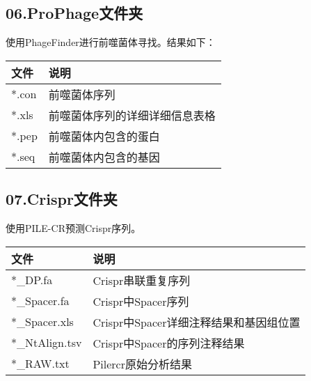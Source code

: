\subsection{06.ProPhage文件夹}
使用PhageFinder进行前噬菌体寻找。结果如下：
\begin{table}[H]
        \begin{center}
            \begin{threeparttable}
                \begin{tabularx}{\textwidth}{XX}

                    \toprule
                    \bfseries{文件}                  &\bfseries{说明}\\
                    \midrule
                    *.con                           &前噬菌体序列\\
                    *.xls                           &前噬菌体序列的详细详细信息表格\\
                    *.pep                           &前噬菌体内包含的蛋白\\
                    *.seq                           &前噬菌体内包含的基因\\
                    \bottomrule

                \end{tabularx}

            \end{threeparttable}
        \end{center}
\end{table}

\subsection{07.Crispr文件夹}
使用PILE-CR预测Crispr序列。
\begin{table}[H]
        \begin{center}
            \begin{threeparttable}
                \begin{tabularx}{\textwidth}{XX}

                    \toprule
                    \bfseries{文件}                  &\bfseries{说明}\\
                    \midrule
                    *\_DP.fa                        &Crispr串联重复序列\\
                    *\_Spacer.fa                    &Crispr中Spacer序列\\
                    *\_Spacer.xls                   &Crispr中Spacer详细注释结果和基因组位置\\
                    *\_NtAlign.tsv                  &Crispr中Spacer的序列注释结果\\
                    *\_RAW.txt                      &Pilercr原始分析结果\\
                    \bottomrule

                \end{tabularx}

            \end{threeparttable}
        \end{center}
\end{table}

